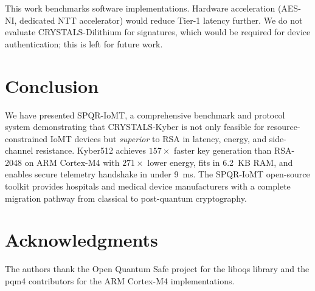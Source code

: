 \documentclass[10pt,journal,compsoc]{IEEEtran}
\begin{document}
This work benchmarks software implementations.
Hardware acceleration (AES-NI, dedicated NTT accelerator) would
reduce Tier-1 latency further.
We do not evaluate CRYSTALS-Dilithium for signatures, which
would be required for device authentication; this is left for future
work.

\section{Conclusion}
\label{sec:conclusion}

We have presented SPQR-IoMT, a comprehensive benchmark and protocol
system demonstrating that CRYSTALS-Kyber is not only feasible for
resource-constrained IoMT devices but \emph{superior} to RSA in
latency, energy, and side-channel resistance.
Kyber512 achieves $157\times$ faster key generation than RSA-2048
on ARM Cortex-M4 with $271\times$ lower energy, fits in 6.2~KB RAM,
and enables secure telemetry handshake in under 9~ms.
The SPQR-IoMT open-source toolkit provides hospitals and medical
device manufacturers with a complete migration pathway from
classical to post-quantum cryptography.

\section*{Acknowledgments}
The authors thank the Open Quantum Safe project for the liboqs library
and the pqm4 contributors for the ARM Cortex-M4 implementations.
\end{document}
